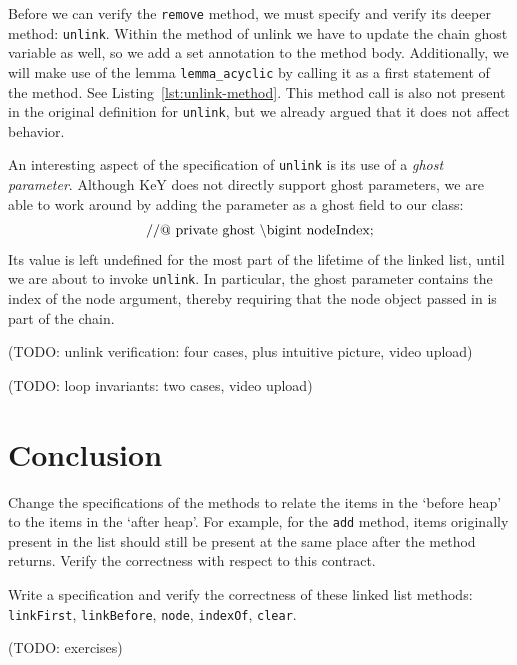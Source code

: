 \documentclass[runningheads]{llncs}
\def\bs{\char092}
\begin{document}
Before we can verify the \texttt{remove} method, we must specify and verify its deeper method: \texttt{unlink}. Within the method of unlink we have to update the chain ghost variable as well, so we add a set annotation to the method body. Additionally, we will make use of the lemma \texttt{lemma\_acyclic} by calling it as a first statement of the method. See Listing~\ref{lst:unlink-method}. This method call is also not present in the original definition for \texttt{unlink}, but we already argued that it does not affect behavior.



An interesting aspect of the specification of \texttt{unlink} is its use of a \emph{ghost parameter}. Although KeY does not directly support ghost parameters, we are able to work around by adding the parameter as a ghost field to our class:
$$\mathrm{//@\ private\ ghost\ \bs bigint\ nodeIndex;}$$
Its value is left undefined for the most part of the lifetime of the linked list, until we are about to invoke \texttt{unlink}. In particular, the ghost parameter contains the index of the node argument, thereby requiring that the node object passed in is part of the chain.



(TODO: unlink verification: four cases, plus intuitive picture, video upload)

(TODO: loop invariants: two cases, video upload)

\section{Conclusion}\label{sec:conclusion}

\begin{exercise}
Change the specifications of the methods to relate the items in the `before heap' to the items in the `after heap'. For example, for the \texttt{add} method, items originally present in the list should still be present at the same place after the method returns. Verify the correctness with respect to this contract.
\end{exercise}

\begin{exercise}
Write a specification and verify the correctness of these linked list methods: \texttt{linkFirst}, \texttt{linkBefore}, \texttt{node}, \texttt{indexOf}, \texttt{clear}.
\end{exercise}

(TODO: exercises)




\end{document}
